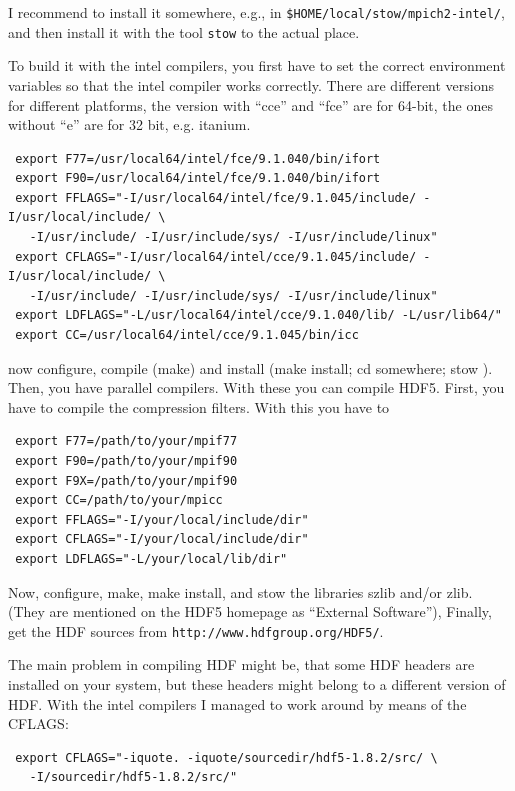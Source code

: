 \documentclass[a4paper]{article}
\begin{document}
I recommend to install it somewhere, e.g., in \verb|$HOME/local/stow/mpich2-intel/|,
and then install it with the tool \verb|stow| to the actual place.

To build it with the intel compilers, you first have to set the correct 
environment variables so that the intel compiler works correctly. There are 
different versions for different platforms, the version with ``cce'' and ``fce''
are for 64-bit, the ones without ``e'' are for 32 bit, e.g. itanium.
\begin{verbatim}
 export F77=/usr/local64/intel/fce/9.1.040/bin/ifort
 export F90=/usr/local64/intel/fce/9.1.040/bin/ifort
 export FFLAGS="-I/usr/local64/intel/fce/9.1.045/include/ -I/usr/local/include/ \
   -I/usr/include/ -I/usr/include/sys/ -I/usr/include/linux"
 export CFLAGS="-I/usr/local64/intel/cce/9.1.045/include/ -I/usr/local/include/ \
   -I/usr/include/ -I/usr/include/sys/ -I/usr/include/linux"
 export LDFLAGS="-L/usr/local64/intel/cce/9.1.040/lib/ -L/usr/lib64/"
 export CC=/usr/local64/intel/cce/9.1.045/bin/icc
\end{verbatim}

now configure, compile (make) and install (make install; cd somewhere; stow ). 
Then, you have parallel compilers.
With these you can compile HDF5. First, you have to compile the compression 
filters. With this you have to 

\begin{verbatim}
 export F77=/path/to/your/mpif77
 export F90=/path/to/your/mpif90
 export F9X=/path/to/your/mpif90
 export CC=/path/to/your/mpicc
 export FFLAGS="-I/your/local/include/dir"
 export CFLAGS="-I/your/local/include/dir"
 export LDFLAGS="-L/your/local/lib/dir"
\end{verbatim}

Now, configure, make, make install, and stow the libraries szlib and/or zlib.
(They are mentioned on the HDF5 homepage as ``External Software''),
Finally, get the HDF sources from \verb|http://www.hdfgroup.org/HDF5/|.

The main problem in compiling HDF might be, that some HDF headers are installed 
on your system, but these headers might belong to a different version of HDF.
With the intel compilers I managed to work around by means of the CFLAGS:

\begin{verbatim}
 export CFLAGS="-iquote. -iquote/sourcedir/hdf5-1.8.2/src/ \ 
   -I/sourcedir/hdf5-1.8.2/src/"
\end{verbatim}
\end{document}
